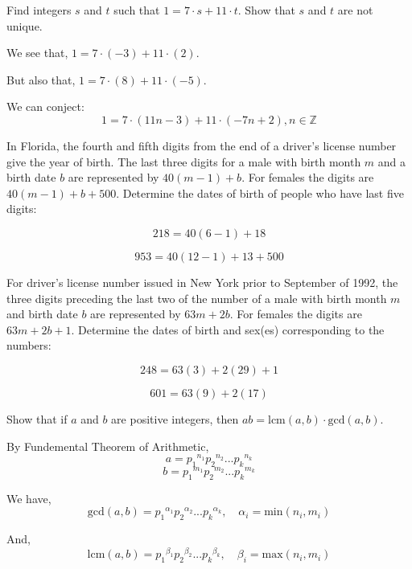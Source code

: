 \documentclass[11pt,largemargins]{homework}
\begin{document}
\question 
Find integers $s$ and $t$ such that $1 = 7 \cdot s + 11 \cdot t$. Show that $s$ and $t$ are not unique.

\quad We see that, $1=7\cdot(-3)+11\cdot(2)$.

\quad But also that, $1=7\cdot(8)+11\cdot(-5)$.

\quad We can conject:
$$1=7\cdot(11n-3)+11\cdot(-7n+2), n\in\mathbb{Z}$$


\question 
In Florida, the fourth and fifth digits from the end of a driver's license number give the year of birth. The last three 
digits for a male with birth month $m$ and a birth date $b$ are represented by $40(m-1)+b$. For females the digits are 
$40(m-1)+b+500$. Determine the dates of birth of people who have last five digits:

\begin{alphaparts}
    $$218 = 40(6-1)+18$$

    $$953 = 40(12-1)+13+500$$

\end{alphaparts}

\question 
For driver's license number issued in New York prior to September of 1992, the three digits preceding the last two of the 
number of a male with birth month $m$ and birth date $b$ are represented by $63m+2b$. For females the digits are 
$63m+2b+1$. Determine the dates of birth and sex(es) corresponding to the numbers:

\begin{alphaparts}
    $$248 = 63(3)+2(29)+1$$

    $$601 = 63(9)+2(17)$$

\end{alphaparts}

\question
Show that if $a$ and $b$ are positive integers, then $ab = \text{lcm} (a,b) \cdot \text{gcd} (a,b)$.

\quad By Fundemental Theorem of Arithmetic, 
$$a = {p_1}^{n_1}{p_2}^{n_2}...{p_k}^{n_k}$$
$$b = {p_1}^{m_1}{p_2}^{m_2}...{p_k}^{m_k}$$

\quad We have,
$$\text{gcd}(a,b) = {p_1}^{\alpha_1}{p_2}^{\alpha_2}...{p_k}^{\alpha_k}, \quad \alpha_i = \text{min}(n_i, m_i)$$

\quad And, 
$$\text{lcm}(a,b) = {p_1}^{\beta_1}{p_2}^{\beta_2}...{p_k}^{\beta_k}, \quad \beta_i = \text{max}(n_i, m_i)$$
\end{document}
